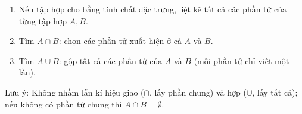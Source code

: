 \begin{enumerate}
\item Nếu tập hợp cho bằng tính chất đặc trưng, liệt kê tất cả các phần tử của từng tập hợp $A, B$.
\item Tìm $A \cap B$: chọn các phần tử xuất hiện ở cả $A$ và $B$.
\item Tìm $A \cup B$: gộp tất cả các phần tử của $A$ và $B$ (mỗi phần tử chỉ viết một lần).
\end{enumerate}
Lưu ý: Không nhầm lẫn kí hiệu giao ($\cap$, lấy phần chung) và hợp ($\cup$, lấy tất cả); nếu không có phần tử chung thì $A \cap B = \emptyset$.
